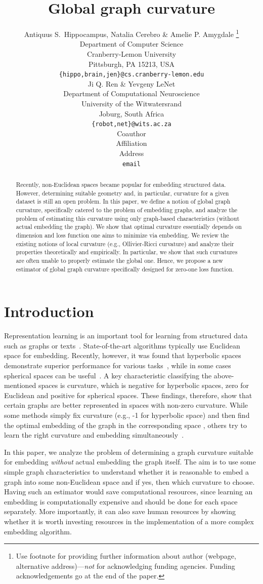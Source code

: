 \documentclass{article} %
\title{Global graph curvature}
\author{Antiquus S.~Hippocampus, Natalia Cerebro \& Amelie P. Amygdale \thanks{ Use footnote for providing further information
about author (webpage, alternative address)---\emph{not} for acknowledging
funding agencies.  Funding acknowledgements go at the end of the paper.} \\
Department of Computer Science\\
Cranberry-Lemon University\\
Pittsburgh, PA 15213, USA \\
\texttt{\{hippo,brain,jen\}@cs.cranberry-lemon.edu} \\
\And
Ji Q. Ren \& Yevgeny LeNet \\
Department of Computational Neuroscience \\
University of the Witwatersrand \\
Joburg, South Africa \\
\texttt{\{robot,net\}@wits.ac.za} \\
\AND
Coauthor \\
Affiliation \\
Address \\
\texttt{email}
}
\begin{document}
\maketitle

\begin{abstract}
Recently, non-Euclidean spaces became popular for embedding structured data. However, determining suitable geometry and, in particular, curvature for a given dataset is still an open problem. 
In this paper, we define a notion of global graph curvature, specifically catered to the problem of embedding graphs, and analyze the problem of estimating this curvature using only graph-based characteristics (without actual embedding the graph).
We show that optimal curvature essentially depends on dimension and loss function one aims to minimize via embedding.
We review the existing notions of local curvature (e.g., Ollivier-Ricci curvature) and analyze their properties theoretically and empirically. 
In particular, we show that such curvatures are often unable to properly estimate the global one. 
Hence, we propose a new estimator of global graph curvature specifically designed for zero-one loss function.
\end{abstract}

\section{Introduction}

Representation learning is an important tool for learning from structured data such as graphs or texts~\citep{grover2016node2vec,perozzi2014deepwalk,mikolov2013distributed}.
State-of-the-art algorithms typically use Euclidean space for embedding. 
Recently, however, it was found that hyperbolic spaces demonstrate superior performance for various tasks~\citep{nickel2018learning,sala2018representation}, while in some cases spherical spaces can be useful~\citep{liu2017sphereface}. A key characteristic classifying the above-mentioned spaces is curvature, which is negative for hyperbolic spaces, zero for Euclidean and positive for spherical spaces. These findings, therefore, show that certain graphs are better represented in spaces with non-zero curvature. While some methods simply fix curvature (e.g., -1 for hyperbolic space) and then find the optimal embedding of the graph in the corresponding space \citep{nickel2018learning}, others try to learn the right curvature and embedding simultaneously~\citep{gu2019learning}.

In this paper, we analyze the problem of determining a graph curvature suitable for embedding \textit{without} actual embedding the graph itself. The aim is to use some simple graph characteristics to understand whether it is reasonable to embed a graph into some non-Euclidean space and if yes, then which curvature to choose. 
Having such an estimator would save computational resources, since learning an embedding is computationally expensive and should be done for each space separately. 
More importantly, it can also save human resources by showing whether it is worth investing resources in the implementation of a more complex embedding algorithm.
\end{document}
